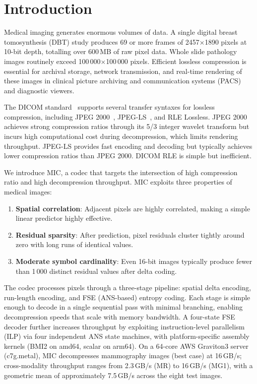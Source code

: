 \documentclass[11pt,twocolumn]{article}
\begin{document}
\section{Introduction}
\label{sec:intro}

Medical imaging generates enormous volumes of data.
A single digital breast tomosynthesis (DBT) study produces 69 or more frames of 2457$\times$1890 pixels at 10-bit depth, totalling over 600\,MB of raw pixel data.
Whole slide pathology images routinely exceed 100\,000$\times$100\,000 pixels.
Efficient lossless compression is essential for archival storage, network transmission, and real-time rendering of these images in clinical picture archiving and communication systems (PACS) and diagnostic viewers.

The DICOM standard~\cite{dicom} supports several transfer syntaxes for lossless compression, including JPEG 2000~\cite{jpeg2000}, JPEG-LS~\cite{jpegls}, and RLE Lossless.
JPEG 2000 achieves strong compression ratios through its 5/3 integer wavelet transform but incurs high computational cost during decompression, which limits rendering throughput.
JPEG-LS provides fast encoding and decoding but typically achieves lower compression ratios than JPEG 2000.
DICOM RLE is simple but inefficient.

We introduce MIC, a codec that targets the intersection of high compression ratio and high decompression throughput.
MIC exploits three properties of medical images:
\begin{enumerate}[nosep]
    \item \textbf{Spatial correlation}: Adjacent pixels are highly correlated, making a simple linear predictor highly effective.
    \item \textbf{Residual sparsity}: After prediction, pixel residuals cluster tightly around zero with long runs of identical values.
    \item \textbf{Moderate symbol cardinality}: Even 16-bit images typically produce fewer than 1\,000 distinct residual values after delta coding.
\end{enumerate}

The codec processes pixels through a three-stage pipeline: spatial delta encoding, run-length encoding, and FSE (ANS-based) entropy coding.
Each stage is simple enough to decode in a single sequential pass with minimal branching, enabling decompression speeds that scale with memory bandwidth.
A four-state FSE decoder further increases throughput by exploiting instruction-level parallelism (ILP) via four independent ANS state machines, with platform-specific assembly kernels (BMI2 on amd64, scalar on arm64).
On a 64-core AWS Graviton3 server (c7g.metal), MIC decompresses mammography images (best case) at 16\,GB/s; cross-modality throughput ranges from 2.3\,GB/s (MR) to 16\,GB/s (MG1), with a geometric mean of approximately 7.5\,GB/s across the eight test images.
\end{document}

